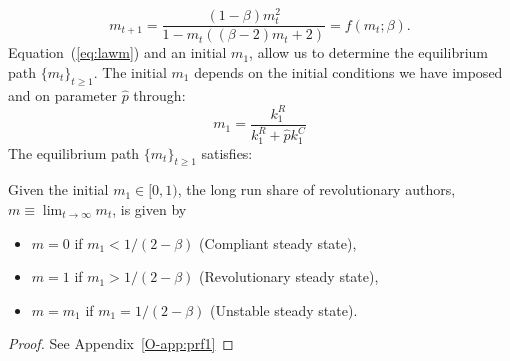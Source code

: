 \begin{equation}
m_{t+1}=\frac{(1-\beta) m_t^2}{1-m_t ((\beta -2) m_t+2)}=f(m_t;\beta)\label{eq:lawm}.
\end{equation}
Equation~(\ref{eq:lawm}) and an initial  $m_1$, allow us to determine the equilibrium path $\{m_t\}_{t\geq1}$. The initial $m_1$ depends on the initial conditions we have imposed and on parameter $\hat{p}$  through:
$$m_1=
\frac{k^R_1}{k^R_1+\hat{p}k^C_1}
$$
The equilibrium path $\{m_t\}_{t\geq1}$  satisfies:
\begin{proposition}
	Given the initial $m_1\in[0,1)$, the long run share of revolutionary authors, $m\equiv\lim_{t\to\infty}m_t$, is given by
	\begin{itemize}[itemsep=1mm, parsep=0pt,topsep=0pt]
    \item[i)]$m=0$ if $m_1<1/(2-\beta)$ (Compliant steady state),
    \item[ii)] $m=1$ if $m_1>1/(2-\beta)$ (Revolutionary steady state),
     \item[iii)]$m=m_1$ if $m_1=1/(2-\beta)$ (Unstable steady state).
	\end{itemize}
	 \label{proposition:dynex}
\end{proposition}
\begin{proof}See Appendix~\ref{O-app:prf1}\end{proof}


